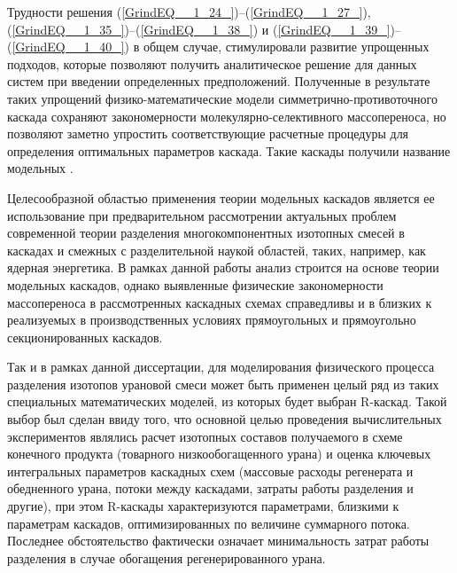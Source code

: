 Трудности решения (\ref{GrindEQ__1_24_})--(\ref{GrindEQ__1_27_}), (\ref{GrindEQ__1_35_})--(\ref{GrindEQ__1_38_}) и (\ref{GrindEQ__1_39_})--(\ref{GrindEQ__1_40_}) в общем случае, стимулировали развитие упрощенных подходов, которые позволяют получить аналитическое решение для данных систем при введении определенных предположений. Полученные в результате таких упрощений физико-математические модели симметрично-противоточного каскада сохраняют закономерности молекулярно-селективного массопереноса, но позволяют заметно упростить соответствующие расчетные процедуры для определения оптимальных параметров каскада. Такие каскады получили название модельных \cite{minenkoTeoriiKaskadovDlya1965, delagarzaMulticomponentIsotopeSeparation1961, zhigalovskiyLekcionnyeMaterialyPo1999, kolokoltsovDesignCascadesSeparating1970, kolokolcovVoprosuPostroeniiKaskadov1970, minenkoPredelnoeObogashcheniePromezhutochnyh1972, yamamotoMulticomponentIsotopeSeparating1978, wuStudyMulticomponentIsotope, borisevichRascheteKaskadovDopolnitelnym1993, woodCriterionEffiencyMultiisotope1999, sulaberidzeOsobennostiObogashcheniyaKomponentov2006, sazykinKvaziidealnyeKaskadyDlya2000, sulaberidzeSravnenieOptimalnyhModelnyh2008}.

Целесообразной областью применения теории модельных каскадов является ее использование при предварительном рассмотрении актуальных проблем современной теории разделения многокомпонентных изотопных смесей в каскадах и смежных с разделительной наукой областей, таких, например, как ядерная энергетика. В рамках данной работы анализ строится на основе теории модельных каскадов, однако выявленные физические закономерности массопереноса в рассмотренных каскадных схемах справедливы и в близких к реализуемых в производственных условиях прямоугольных и прямоугольно секционированных каскадов.

Так и в рамках данной диссертации, для моделирования физического процесса разделения изотопов урановой смеси может быть применен целый ряд из таких специальных математических моделей, из которых будет выбран R-каскад. Такой выбор был сделан ввиду того, что основной целью проведения вычислительных экспериментов являлись расчет изотопных составов получаемого в схеме конечного продукта (товарного низкообогащенного урана) и оценка ключевых интегральных параметров каскадных схем (массовые расходы регенерата и обедненного урана, потоки между каскадами, затраты работы разделения и другие), при этом R-каскады характеризуются параметрами, близкими к параметрам каскадов, оптимизированных по величине суммарного потока. Последнее обстоятельство фактически означает минимальность затрат работы разделения в случае обогащения регенерированного урана. 

